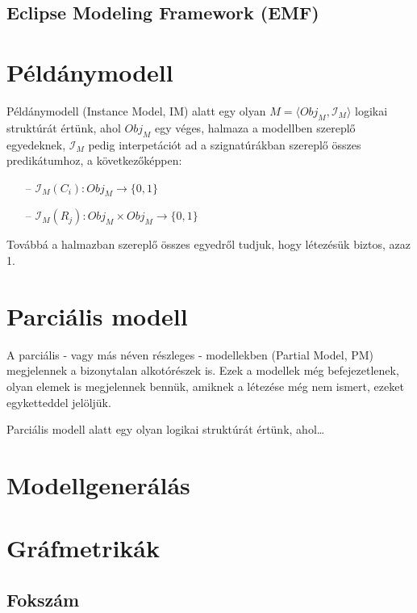 \subsection{Eclipse Modeling Framework (EMF)}




\section{Példánymodell}
\begin{definition}[Példánymodell]
Példánymodell (Instance Model, IM) alatt egy olyan $M = \langle Obj_M, \mathcal{I}_M \rangle$ logikai struktúrát értünk, ahol $Obj_M $ egy véges, halmaza a modellben szereplő egyedeknek, $\mathcal{I}_M$ pedig interpetációt ad a szignatúrákban szereplő összes predikátumhoz, a következőképpen:
\begin{itemize}
\item[--] $\mathcal{I}_M(C_i) : Obj_M \rightarrow \{0, 1\}$
\item[--] $\mathcal{I}_M(R_j) : Obj_M \times Obj_M \rightarrow \{0, 1\}$
\end{itemize}
Továbbá a halmazban szereplő összes egyedről tudjuk, hogy létezésük biztos, azaz 1.
\end{definition}

\section{Parciális modell}

A parciális - vagy más néven részleges - modellekben (Partial Model, PM) megjelennek a bizonytalan alkotórészek is.
Ezek a modellek még befejezetlenek, olyan elemek is megjelennek bennük, amiknek a létezése még nem ismert, ezeket egyketteddel jelöljük.

\begin{definition}
Parciális modell alatt egy olyan logikai struktúrát értünk, ahol\ldots
\end{definition}


\section{Modellgenerálás}
\cite{VS:GraphSolver}

\section{Gráfmetrikák}
\subsection{Fokszám}